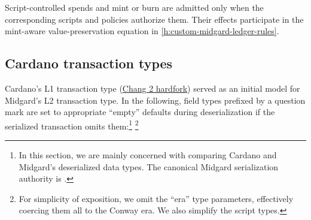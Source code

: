 \documentclass[../midgard.tex]{subfiles}
\begin{document}
Script-controlled spends and mint or burn are admitted only when the
corresponding scripts and policies authorize them. Their effects participate
in the mint-aware value-preservation equation in
\cref{h:custom-midgard-ledger-rules}.

\subsection{Cardano transaction types}
\label{h:cardano-transaction-types}

Cardano's L1 transaction type (\href{https://github.com/IntersectMBO/cardano-ledger/blob/cardano-ledger-conway-1.17.2.0/eras/conway/impl/src/Cardano/Ledger/Conway/Tx.hs}{Chang 2 hardfork}) served as an initial model for Midgard's L2 transaction type.
In the following, field types prefixed by a question mark  are set to appropriate ``empty'' defaults during deserialization if the serialized transaction omits them:\footnote{In this section, we are mainly concerned with comparing Cardano and Midgard's deserialized data types.
The canonical Midgard serialization authority is .} \footnote{For simplicity of exposition, we omit the ``era'' type parameters, effectively coercing them all to the Conway era.
We also simplify the script types.}
\begingroup
\allowdisplaybreaks
\end{document}
